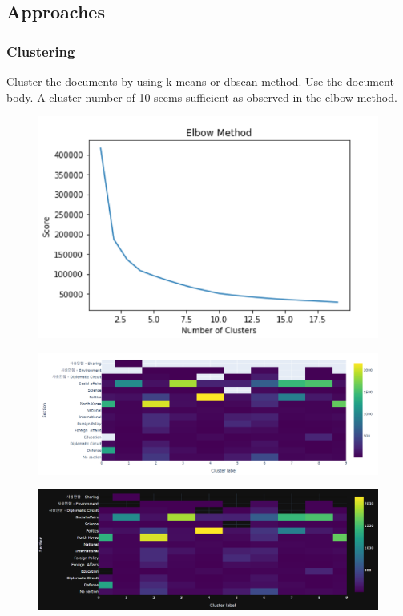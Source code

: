 \documentclass[sigconf,authorversion,nonacm]{acmart}
\begin{document}
\subsection{Approaches}
\subsubsection{Clustering}
Cluster the documents by using k-means or dbscan method. Use the document body.
A cluster number of 10 seems sufficient as observed in the elbow method.

\begin{figure}[ht]
    \includegraphics[width=0.7\linewidth]{img/image6.png}
\end{figure}
\begin{figure}[ht]
    \includegraphics[width=\linewidth]{img/image8.png} 
\end{figure}
\begin{figure}[ht]
    \includegraphics[width=\linewidth]{img/image1.png} 
\end{figure}
\end{document}

